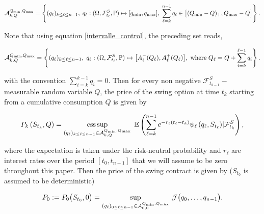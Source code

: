 \documentclass{article}
\DeclareMathOperator*{\esssup}{ess\,sup}
\numberwithin{equation}{section}
\begin{document}
\begin{equation*}
\mathcal{A}_{k, Q}^{Q_{\min}, Q_{\max}} = \left\{(q_{\ell})_{k \le \ell \le n-1}, \hspace{0.1cm} q_{\ell} : (\Omega, \mathcal{F}_{t_{\ell}}^S, \mathbb{P}) \mapsto [q_{\min}, q_{\max}], \hspace{0.1cm} \sum_{\ell = k}^{n-1} q_{\ell} \in \big[(Q_{\min}-Q)_{+}, Q_{\max}-Q \big] \right\}.
\end{equation*}

\noindent
Note that using equation \eqref{intervalle_control}, the preceding set reads,

\begin{equation}
\label{actual_set_adm_const_case}
\mathcal{A}_{k, Q}^{Q_{\min}, Q_{\max}} = \left\{(q_{\ell})_{k \le \ell \le n-1}, \hspace{0.1cm} q_{\ell} : (\Omega, \mathcal{F}_{t_{\ell}}^S, \mathbb{P}) \mapsto \big[A_\ell^{-}(Q_\ell), A_\ell^{+}(Q_\ell) \big], \hspace{0.1cm} \text{where} \hspace{0.1cm} Q_\ell = Q + \sum_{i = k}^{\ell - 1} q_i \right\}.
\end{equation}

\noindent
with the convention $\displaystyle \sum_{i = k}^{k - 1} q_i = 0$. Then for every non negative $\mathcal{F}_{t_{k-1}}^S-$ measurable random variable $Q$, the price of the swing option at time $t_k$ starting from a cumulative consumption $Q$ is given by

\begin{equation}
    P_k\left(S_{t_k}, Q \right) = \esssup_{(q_{\ell})_{k \le \ell \le n-1} \in \mathcal{A}_{k, Q}^{Q_{\min}, Q_{\max}}} \hspace{0.1cm} \mathbb{E}\left(\sum_{\ell=k}^{n-1} e^{-r_\ell(t_{\ell} - t_k)} \psi_\ell\left(q_{\ell}, S_{t_{\ell}} \right) \rvert \mathcal{F}_{t_k}^S \right),
    \label{pricing_swing_formula}
\end{equation}


\noindent
where the expectation is taken under the risk-neutral probability and $r_{\ell}$ are interest rates over the period $[t_0, t_{n-1}]$ that we will assume to be zero throughout this paper. Then the price of the swing contract is given by ($S_{t_0}$ is assumed to be deterministic)

\begin{equation}
    P_0 := P_0\big(S_{t_0}, 0\big) = \underset{(q_\ell)_{0 \le \ell \le n-1} \in \mathcal{A}_{0, 0}^{Q_{\min}, Q_{\max}}}{\sup} \hspace{0.1cm}  \mathcal{J}\big(q_0, \ldots, q_{n-1}\big).
    \label{swing_init_price}
\end{equation}
\end{document}
